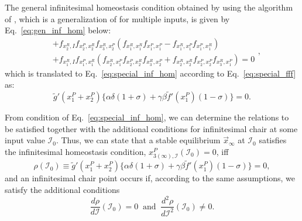 The general infinitesimal homeostasis condition obtained by using the algorithm of 
\cite{multi_input_antoneli2020}, which is a generalization of \cite{wang2021} for multiple inputs, 
is given by Eq.~\ref{eq:gen_inf_hom} below:
\begin{equation} \label{eq:gen_inf_hom}
    \begin{split}
    &+f_{x_2^R, I}f_{x_2^P, x_2^R}f_{x_3^R, x_2^P}(f_{x_1^R, x_1^R}f_{x_1^P, x_1^P} - f_{x_1^R,x_1^P}f_{x_1^P, x_1^R}) \\ 
    &+f_{x_1^R, I}f_{x_1^P,x_1^R}(f_{x_2^R, x_1^P}f_{x_2^P, x_2^R}f_{x_3^R, x_2^P} + f_{x_2^R, x_2^R}f_{x_2^P, x_2^P}f_{x_3^R, x_1^P}) = 0
    \end{split},
\end{equation}
which is translated to Eq.~\ref{eq:special_inf_hom} according to Eq.~\ref{eq:special_fff} as:
\begin{equation} \label{eq:special_inf_hom}
    \tilde{g}'(x_1^P + x_2^P) \bigg\{ \alpha \delta (1+\sigma) + \gamma \beta \tilde{f}'(x_1^P)(1-\sigma) \bigg\} = 0.
\end{equation}

From condition of Eq.~\ref{eq:special_inf_hom}, we can determine the relations 
to be satisfied together with the additional conditions for infinitesimal chair at some
input value $\mathcal{I}_0$. Thus, we can state that a stable equilibrium $\vec{x}_{\infty}$
at $\mathcal{I}_0$ satisfies the infinitesimal homeostasis condition, 
$x_{3(\infty),\mathcal{I}}^P(\mathcal{I}_0) = 0$, iff
\begin{equation} \label{eq:special_inf_hom_rho}
    \rho(\mathcal{I}_0) \equiv \tilde{g}'(x_1^P + x_2^P) \bigg\{ \alpha \delta (1+\sigma) + \gamma \beta \tilde{f}'(x_1^P)(1-\sigma) \bigg\} = 0,
\end{equation}
and an infinitesimal chair point occurs if, according to the same assumptions, we satisfy the additional
conditions
\begin{equation}
    \frac{d\rho}{d\mathcal{I}}(\mathcal{I}_0) = 0 \ \text{ and } \ \frac{d^2\rho}{d\mathcal{I}^2}(\mathcal{I}_0) \neq 0.
\end{equation}

